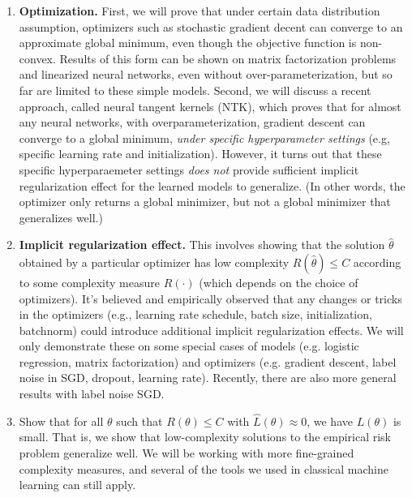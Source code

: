 \begin{enumerate}
    \item \textbf{Optimization.} First, we will prove that under certain data distribution assumption, optimizers such as stochastic gradient decent can converge to an approximate global minimum, even though the objective function is non-convex. Results of this form can be shown on matrix factorization problems and linearized neural networks, even without over-parameterization, but so far are limited to these simple models.  Second, we will discuss a recent approach, called neural tangent kernels (NTK), which proves that for almost any neural networks, with overparameterization, gradient descent can converge to a global minimum, \textit{under specific hyperparameter settings} (e.g, specific learning rate and initialization). However, it turns out that these specific hyperparaemeter settings \textit{does not} provide sufficient implicit regularization effect for the learned models to generalize. (In other words, the optimizer only returns a global minimizer, but not a global minimizer that generalizes well.)
    
    \item \textbf{Implicit regularization effect.} This involves showing that the solution $\hat{\theta}$ obtained by a particular optimizer has low complexity $R(\hat{\theta})\leq C$ according to some complexity measure $R(\cdot)$ (which depends on the choice of optimizers). It's believed and empirically observed that any changes or tricks in the optimizers (e.g., learning rate schedule, batch size, initialization, batchnorm) could introduce additional implicit regularization effects. We will only demonstrate these on some special cases of models (e.g. logistic regression, matrix factorization) and optimizers (e.g. gradient descent, label noise in SGD, dropout, learning rate). Recently, there are also more general results with label noise SGD. 
    
    \item Show that for all $\theta$ such that $R(\theta)\leq C$ with $\hat{L}(\theta)\approx 0$, we have $L(\theta)$ is small. That is, we show that low-complexity solutions to the empirical risk problem generalize well. We will be working with more fine-grained complexity measures, and several of the tools we used in classical machine learning can still apply.
\end{enumerate}